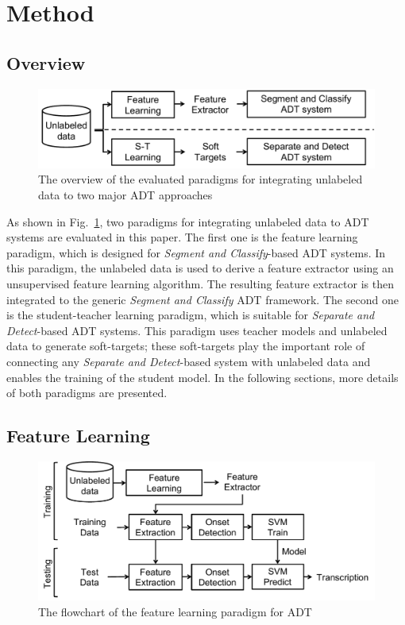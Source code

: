 \documentclass{article}
\begin{document}
%
\section{Method}
\label{sec:method}
\subsection{Overview}

\begin{figure}
\centering
\includegraphics[width = \columnwidth]{./figs/paradigms_overview.pdf}
\caption{The overview of the evaluated paradigms for integrating unlabeled data to two major ADT approaches}
\label{fig:overview}
\end{figure}

As shown in Fig.~\ref{fig:overview}, two paradigms for integrating unlabeled data to ADT systems are evaluated in this paper. The first one is the feature learning paradigm, which is designed for \textit{Segment and Classify}-based ADT systems. In this paradigm, the unlabeled data is used to derive a feature extractor using an unsupervised feature learning algorithm. The resulting feature extractor is then integrated to the generic \textit{Segment and Classify} ADT framework. The second one is the student-teacher learning paradigm, which is suitable for \textit{Separate and Detect}-based ADT systems. This paradigm uses teacher models and unlabeled data to generate soft-targets; these soft-targets play the important role of connecting any \textit{Separate and Detect}-based system with unlabeled data and enables the training of the student model. In the following sections, more details of both paradigms are presented. 

\subsection{Feature Learning}
\label{subsec:featureLearning}


\begin{figure}
\centering
\includegraphics[width = \columnwidth]{./figs/featurelearningSys.pdf}
\caption{The flowchart of the feature learning paradigm for ADT}
\label{fig:featureLearningFlow}
\end{figure}
\end{document}
